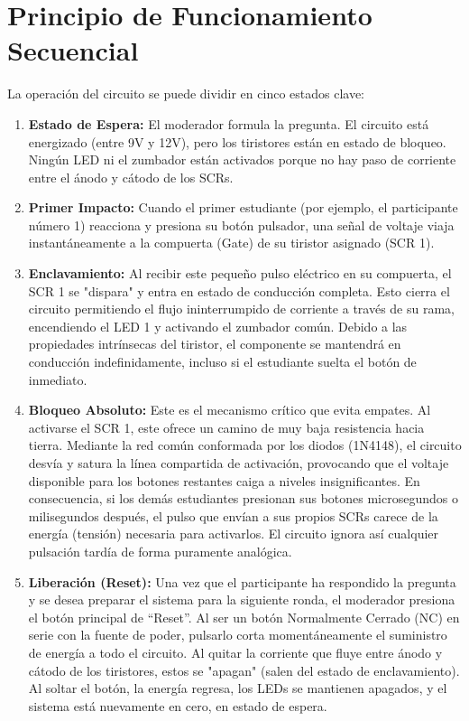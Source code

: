 \documentclass[12pt,a4paper]{article}
\begin{document}
\section{Principio de Funcionamiento Secuencial}
La operación del circuito se puede dividir en cinco estados clave:

\begin{enumerate}
    \item \textbf{Estado de Espera:} El moderador formula la pregunta. El circuito está energizado (entre 9V y 12V), pero los tiristores están en estado de bloqueo. Ningún LED ni el zumbador están activados porque no hay paso de corriente entre el ánodo y cátodo de los SCRs.
    
    \item \textbf{Primer Impacto:} Cuando el primer estudiante (por ejemplo, el participante número 1) reacciona y presiona su botón pulsador, una señal de voltaje viaja instantáneamente a la compuerta (Gate) de su tiristor asignado (SCR 1).
    
    \item \textbf{Enclavamiento:} Al recibir este pequeño pulso eléctrico en su compuerta, el SCR 1 se "dispara" y entra en estado de conducción completa. Esto cierra el circuito permitiendo el flujo ininterrumpido de corriente a través de su rama, encendiendo el LED 1 y activando el zumbador común. Debido a las propiedades intrínsecas del tiristor, el componente se mantendrá en conducción indefinidamente, incluso si el estudiante suelta el botón de inmediato.
    
    \item \textbf{Bloqueo Absoluto:} Este es el mecanismo crítico que evita empates. Al activarse el SCR 1, este ofrece un camino de muy baja resistencia hacia tierra. Mediante la red común conformada por los diodos (1N4148), el circuito desvía y satura la línea compartida de activación, provocando que el voltaje disponible para los botones restantes caiga a niveles insignificantes. En consecuencia, si los demás estudiantes presionan sus botones microsegundos o milisegundos después, el pulso que envían a sus propios SCRs carece de la energía (tensión) necesaria para activarlos. El circuito ignora así cualquier pulsación tardía de forma puramente analógica.
    
    \item \textbf{Liberación (Reset):} Una vez que el participante ha respondido la pregunta y se desea preparar el sistema para la siguiente ronda, el moderador presiona el botón principal de ``Reset''. Al ser un botón Normalmente Cerrado (NC) en serie con la fuente de poder, pulsarlo corta momentáneamente el suministro de energía a todo el circuito. Al quitar la corriente que fluye entre ánodo y cátodo de los tiristores, estos se "apagan" (salen del estado de enclavamiento). Al soltar el botón, la energía regresa, los LEDs se mantienen apagados, y el sistema está nuevamente en cero, en estado de espera.
\end{enumerate}
\end{document}
